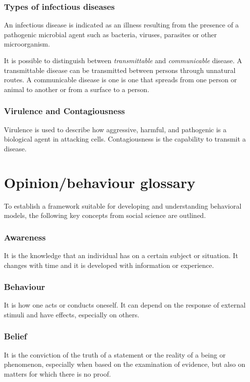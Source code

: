 \subsubsection{Types of infectious diseases}An infectious disease is indicated as an illness resulting from the presence of a pathogenic microbial agent such as bacteria, viruses, parasites or other microorganism.

It is possible to distinguish between \textit{transmittable} and \textit{communicable} disease. A transmittable disease can be transmitted between persons through unnatural routes. A communicable disease is one is one that spreads from one person or animal to another or from a surface to a person.  


\subsubsection{Virulence and Contagiousness}  Virulence is used to describe how aggressive, harmful, and pathogenic is a biological agent in attacking cells. Contagiousness is the capability to transmit a disease. 


\section{Opinion/behaviour glossary}
To establish a framework suitable for developing and understanding behavioral models, the following key concepts from social science are outlined.
\subsubsection{Awareness} It is the knowledge that an individual has on a certain subject or situation. It changes with time and it is developed with information or experience.  

\subsubsection{Behaviour} It is how one acts or conducts oneself. It can depend on the response of external stimuli and have effects, especially on others.


\subsubsection{Belief} It is the conviction of the truth of a statement or the reality of a being or phenomenon, especially when based on the examination of evidence, but also on matters for which there is no proof.


